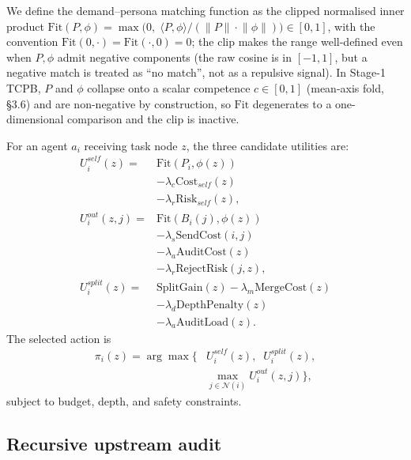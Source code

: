 \documentclass[11pt]{article}
\begin{document}
We define the demand--persona matching function as the clipped normalised inner product $\mathrm{Fit}(P, \phi){=}\max\big(0,\;\langle P,\phi \rangle / (\lVert P\rVert\cdot\lVert\phi\rVert)\big)\in[0,1]$, with the convention $\mathrm{Fit}(0,\cdot){=}\mathrm{Fit}(\cdot,0){=}0$; the clip makes the range well-defined even when $P,\phi$ admit negative components (the raw cosine is in $[-1,1]$, but a negative match is treated as ``no match'', not as a repulsive signal). In Stage-1 TCPB, $P$ and $\phi$ collapse onto a scalar competence $c\in[0,1]$ (mean-axis fold, \S 3.6) and are non-negative by construction, so $\mathrm{Fit}$ degenerates to a one-dimensional comparison and the clip is inactive.

For an agent $a_i$ receiving task node $z$, the three candidate utilities are:
\begin{align*}
U_i^{\mathit{self}}(z) ={} & \mathrm{Fit}(P_i, \phi(z)) \\
                           & - \lambda_c \mathrm{Cost}_{\mathit{self}}(z) \\
                           & - \lambda_r \mathrm{Risk}_{\mathit{self}}(z), \\
U_i^{\mathit{out}}(z, j) ={} & \mathrm{Fit}(B_i(j), \phi(z)) \\
                            & - \lambda_s \mathrm{SendCost}(i,j) \\
                            & - \lambda_a \mathrm{AuditCost}(z) \\
                            & - \lambda_r \mathrm{RejectRisk}(j,z), \\
U_i^{\mathit{split}}(z) ={} & \mathrm{SplitGain}(z) - \lambda_m \mathrm{MergeCost}(z) \\
                            & - \lambda_d \mathrm{DepthPenalty}(z) \\
                            & - \lambda_a \mathrm{AuditLoad}(z).
\end{align*}
The selected action is
\begin{align*}
\pi_i(z) = \arg\max \big\{ & U_i^{\mathit{self}}(z), \;\; U_i^{\mathit{split}}(z), \\
                            & \textstyle\max_{j \in \mathcal{N}(i)} U_i^{\mathit{out}}(z,j) \big\},
\end{align*}
subject to budget, depth, and safety constraints.

\subsection{Recursive upstream audit}
\end{document}
